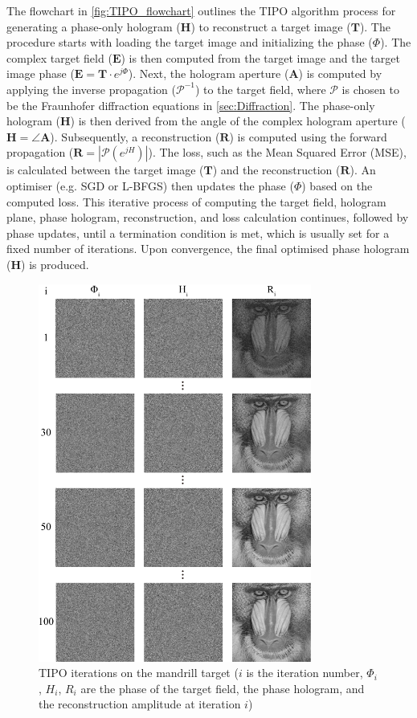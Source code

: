 The flowchart in \cref{fig:TIPO_flowchart} outlines the TIPO algorithm process for generating a phase-only hologram ($\textbf{H}$) to reconstruct a target image ($\textbf{T}$). The procedure starts with loading the target image and initializing the phase ($\Phi$). The complex target field ($\textbf{E}$) is then computed from the target image and the target image phase ($\textbf{E} = \textbf{T} \cdot e^{j\Phi}$). Next, the hologram aperture ($\textbf{A}$) is computed by applying the inverse propagation ($\mathcal{P}^{-1}$) to the target field, where $\mathcal{P}$ is chosen to be the Fraunhofer diffraction equations in \cref{sec:Diffraction}. The phase-only hologram ($\textbf{H}$) is then derived from the angle of the complex hologram aperture ($\textbf{H} = \angle \textbf{A}$). Subsequently, a reconstruction ($\textbf{R}$) is computed using the forward propagation ($\textbf{R} = |\mathcal{P}(e^{jH})|$). The loss, such as the Mean Squared Error (MSE), is calculated between the target image ($\textbf{T}$) and the reconstruction ($\textbf{R}$). An optimiser (e.g. SGD or L-BFGS) then updates the phase ($\Phi$) based on the computed loss. This iterative process of computing the target field, hologram plane, phase hologram, reconstruction, and loss calculation continues, followed by phase updates, until a termination condition is met, which is usually set for a fixed number of iterations. Upon convergence, the final optimised phase hologram ($\textbf{H}$) is produced.

\begin{figure}[H]
	\centering
	\includegraphics[width=0.8\textwidth]{TIPO_iters.pdf}
	\caption{TIPO iterations on the mandrill target ($i$ is the iteration number, $\Phi_i$, $H_i$, $R_i$ are the phase of the target field, the phase hologram, and the reconstruction amplitude at iteration $i$)}
	\label{fig:TIPO_iters}
\end{figure}

